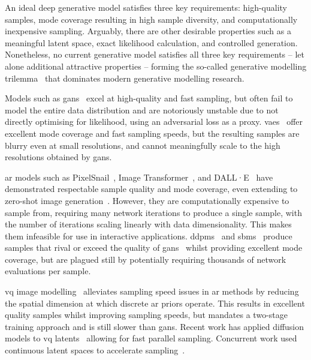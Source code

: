 An ideal deep generative model satisfies three key requirements: high-quality
samples, mode coverage resulting in high sample diversity, and computationally
inexpensive sampling. Arguably, there are other desirable properties such as a
meaningful latent space, exact likelihood calculation, and controlled
generation. Nonetheless, no current generative model satisfies all three key
requirements -- let alone additional attractive properties -- forming the
so-called generative modelling trilemma~\cite{xiao2021trilemma} that dominates
modern generative modelling research.

Models such as \glspl{gan}~\cite{goodfellow2014gan} excel at high-quality and
fast sampling, but often fail to model the entire data distribution and are
notoriously unstable due to not directly optimising for likelihood, using an
adversarial loss as a proxy. \Glspl{vae}~\cite{kingma2013vae} offer excellent
mode coverage and fast sampling speeds, but the resulting samples are blurry
even at small resolutions, and cannot meaningfully scale to the high resolutions
obtained by \glspl{gan}.

\Gls{ar} models such as PixelSnail~\cite{chen2017snail}, Image
Transformer~\cite{parmar2018image}, and DALL·E~\cite{parmar2018image} have
demonstrated respectable sample quality and mode coverage, even extending to
zero-shot image generation~\cite{ramesh2021dalle}. However, they are
computationally expensive to sample from, requiring many network iterations to
produce a single sample, with the number of iterations scaling linearly with
data dimensionality. This makes them infeasible for use in interactive
applications. \Glspl{ddpm}~\cite{ho2020ddpm} and
\glspl{sbm}~\cite{song2019sbm,song2020sde,song2021mlt} produce samples that
rival or exceed the quality of \glspl{gan}~\cite{dhariwal2021ddpm} whilst
providing excellent mode coverage, but are plagued still by potentially
requiring thousands of network evaluations per sample.

\Gls{vq} image
modelling~\cite{oord2017vqvae,razavi2019generating,esser2021taming} alleviates
sampling speed issues in \gls{ar} methods by reducing the spatial dimension at
which discrete \gls{ar} priors operate. This results in excellent quality
samples whilst improving sampling speeds, but mandates a two-stage training
approach and is still slower than \glspl{gan}. Recent work has
applied diffusion models to \gls{vq} latents~\cite{bondtaylor2021unleashing}
allowing for fast parallel sampling. Concurrent work used continuous latent
spaces to accelerate sampling~\cite{xiao2021trilemma,vahdat2021sbmlatent}.


